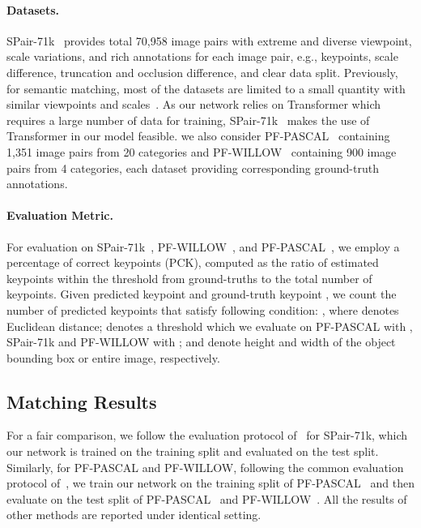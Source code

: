 \paragraph{Datasets.}
SPair-71k~\cite{min2019spair} provides total 70,958 image pairs with extreme and diverse viewpoint, scale variations, and rich annotations for each image pair, e.g., keypoints, scale difference, truncation and occlusion difference, and clear data split. Previously, for semantic matching, most of the datasets are limited to a small quantity with similar viewpoints and scales~\cite{ham2016proposal,ham2017proposal}. As our network relies on Transformer which requires a large number of data for training, SPair-71k~\cite{min2019spair} makes the use of Transformer in our model feasible. 
we also consider PF-PASCAL~\cite{ham2017proposal} containing 1,351 image pairs from 20 categories and PF-WILLOW~\cite{ham2016proposal} containing 900 image pairs from 4 categories, each dataset providing corresponding ground-truth annotations. \vspace{-5pt}

\paragraph{Evaluation Metric.}
For evaluation on SPair-71k~\cite{min2019spair}, PF-WILLOW~\cite{ham2016proposal}, and PF-PASCAL~\cite{ham2017proposal}, we employ a percentage of correct keypoints (PCK), computed as the ratio of estimated keypoints within the threshold from ground-truths to the total number of keypoints. Given predicted keypoint  and ground-truth keypoint , we count the number of predicted keypoints that satisfy following condition: , where  denotes Euclidean distance;  denotes a threshold which we evaluate on PF-PASCAL with , SPair-71k and PF-WILLOW with ;  and  denote height and width of the object bounding box or entire image, respectively. 

\subsection{Matching Results}\label{sec:4.3}
For a fair comparison, we follow the evaluation protocol of~\cite{min2019hyperpixel} for SPair-71k, which our network is trained on the training split and evaluated on the test split. Similarly, for PF-PASCAL and PF-WILLOW, following the common evaluation protocol of~\cite{han2017scnet,kim2018recurrent,huang2019dynamic,min2019hyperpixel,min2020learning}, we train our network on the training split of PF-PASCAL~\cite{ham2017proposal} and then evaluate on the test split of PF-PASCAL~\cite{ham2017proposal} and PF-WILLOW~\cite{ham2016proposal}. All the results of other methods are reported under identical setting.

